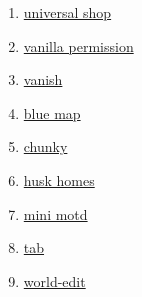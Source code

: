\begin{enumerate}
    \item \href{https://github.com/Patbox/UniversalShops}{universal shop}
    \item \href{https://github.com/DrexHD/VanillaPermissions}{vanilla permission}
    \item \href{https://github.com/DrexHD/Vanish}{vanish}
    \item \href{https://github.com/BlueMap-Minecraft/BlueMap}{blue map}
    \item \href{https://github.com/pop4959/Chunky}{chunky}
    \item \href{https://github.com/WiIIiam278/HuskHomes/}{husk homes}
    \item \href{https://github.com/jpenilla/MiniMOTD}{mini motd}
    \item \href{https://github.com/NEZNAMY/TAB}{tab}
    \item \href{https://github.com/EngineHub/WorldEdit/}{world-edit}
\end{enumerate}


